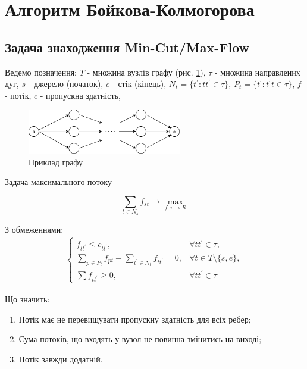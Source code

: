\section{Алгоритм Бойкова-Колмогорова}

\subsection{Задача знаходження Min-Cut/Max-Flow}

Ведемо позначення:
$T$ - множина вузлів графу (рис. \ref{fig:graph_example}), 
$\tau$ - множина направлених дуг,
$s$ - джерело (початок),
$e$ - стік (кінець),
$N_t = \{t^{'}: tt^{'} \in \tau \}$,
$P_t = \{t^{'}: t^{'}t \in \tau \}$,
$f$ - потік,
$c$ - пропускна здатність,

\begin{figure}[h]
    \centering
    \includegraphics[width=0.6\textwidth]{images/graph_example}
    \caption{Приклад графу}
    \label{fig:graph_example}
\end{figure}

Задача максимального потоку

\begin{equation}
    \sum_{t \in N_s} f_{st} \rightarrow \max_{f: \tau \rightarrow R }
\end{equation}

З обмеженнями: 
\begin{equation} 
    \begin{gathered}
        \begin{cases}
            f_{tt^{'}} \leq  c_{tt^{'}}, &  \forall tt^{'}  \in \tau , \\

            \sum_{p \in P_t} f_{pt} - \sum_{t^{'} \in N_t} f_{tt^{'}} = 0, & 
            \forall t \in T \setminus \{s,e\}, \\

            \sum f_{tt^{'}} \geq 0, & \forall tt^{'}  \in \tau
        \end{cases}
\end{gathered}
\end{equation}

Що значить:
\begin{enumerate}
    \item Потік має не перевищувати пропускну здатність для всіх ребер;
    \item Сума потоків, що входять у вузол не повинна змінитись на виході;
    \item Потік завжди додатній.
\end{enumerate}

